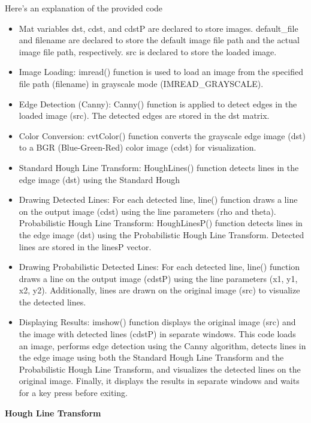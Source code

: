 \documentclass[a4paper,11pt]{article}%
\newenvironment{qanda}{\setlength{\parindent}{0pt}}{\bigskip}
\begin{document}
\begin{qanda}
\begin{enumerate}
Here's an explanation of the provided code
\begin{itemize}
	\item Mat variables dst, cdst, and cdstP are declared to store images.
	default\_file and filename are declared to store the default image file path and the actual
	image file path, respectively.
	src is declared to store the loaded image.
	\item Image Loading:
	imread() function is used to load an image from the specified file path (filename) in
	grayscale mode (IMREAD\_GRAYSCALE).
	\item Edge Detection (Canny):
	Canny() function is applied to detect edges in the loaded image (src). The detected
	edges are stored in the dst matrix.
	\item Color Conversion:
	cvtColor() function converts the grayscale edge image (dst) to a BGR (Blue-Green-Red)
	color image (cdst) for visualization.
	\item Standard Hough Line Transform:
	HoughLines() function detects lines in the edge image (dst) using the Standard Hough
	\item Drawing Detected Lines:
	For each detected line, line() function draws a line on the output image (cdst) using the
	line parameters (rho and theta).
	Probabilistic Hough Line Transform:
	HoughLinesP() function detects lines in the edge image (dst) using the Probabilistic
	Hough Line Transform. Detected lines are stored in the linesP vector.
	\item Drawing Probabilistic Detected Lines:
	For each detected line, line() function draws a line on the output image (cdstP) using the
	line parameters (x1, y1, x2, y2). Additionally, lines are drawn on the original image (src)
	to visualize the detected lines.
	\item Displaying Results:
	imshow() function displays the original image (src) and the image with detected lines
	(cdstP) in separate windows.
	This code loads an image, performs edge detection using the Canny algorithm, detects lines in
	the edge image using both the Standard Hough Line Transform and the Probabilistic Hough
	Line Transform, and visualizes the detected lines on the original image. Finally, it displays the
	results in separate windows and waits for a key press before exiting.	

\end{itemize}

\textbf{Hough Line Transform}



\end{enumerate}
\end{qanda}
\end{document}
